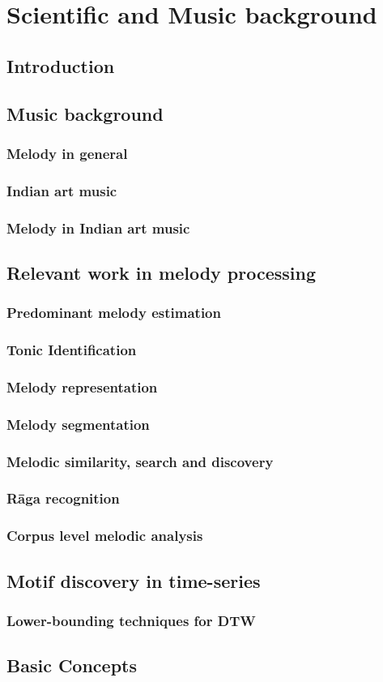 
\chapter{Scientific and Music background}

\section{Introduction}

\section{Music background}

\subsection{Melody in general}
\subsection{Indian art music}
\subsection{Melody in Indian art music}

\section{Relevant work in melody processing}
\subsection{Predominant melody estimation}
\subsection{Tonic Identification}
\subsection{Melody representation}
\subsection{Melody segmentation}
\subsection{Melodic similarity, search and discovery}
\subsection{R\={a}ga recognition}
\subsection{Corpus level melodic analysis}

\section{Motif discovery in time-series}
\subsection{Lower-bounding techniques for DTW}

\section{{Basic Concepts}}